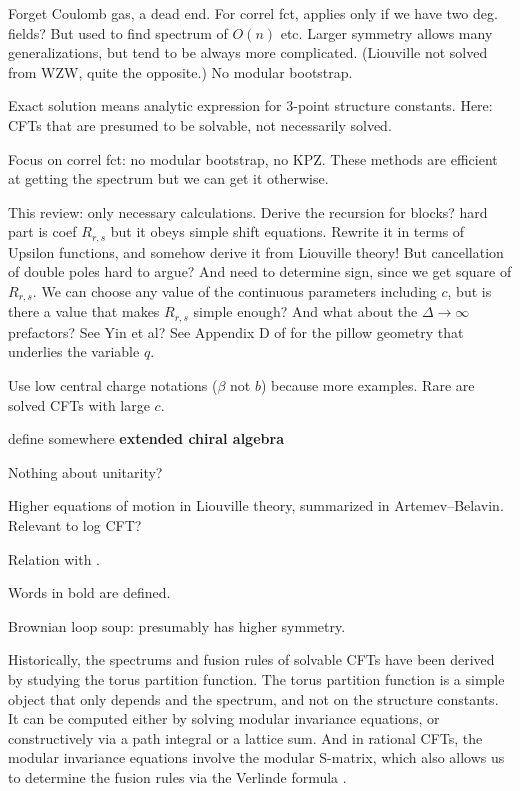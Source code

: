 \documentclass[12pt, a4paper]{article}
\theoremstyle{break}
\begin{document}
Forget Coulomb gas, a dead end. For correl fct, applies only if we have two deg. fields? But used to find spectrum of $O(n)$ etc. Larger symmetry allows many generalizations, but tend to be always more complicated. (Liouville not solved from WZW, quite the opposite.) No modular bootstrap. 

Exact solution means analytic expression for 3-point structure constants. Here: CFTs that are presumed to be solvable, not necessarily solved. 

Focus on correl fct: no modular bootstrap, no KPZ. These methods are efficient at getting the spectrum but we can get it otherwise. 

This review: only necessary calculations. Derive the recursion for blocks? hard part is coef $R_{r,s}$ but it obeys simple shift equations. Rewrite it in terms of Upsilon functions, and somehow derive it from Liouville theory! But cancellation of double poles hard to argue? And need to determine sign, since we get square of $R_{r,s}$. We can choose any value of the continuous parameters including $c$, but is there a value that makes $R_{r,s}$ simple enough? And what about the $\Delta\to\infty$ prefactors? See Yin et al? See Appendix D of \cite{msz15} for the pillow geometry that underlies the variable $q$.

Use low central charge notations ($\beta$ not $b$) because more examples. Rare are solved CFTs with large $c$.

define somewhere \textbf{extended chiral algebra}

Nothing about unitarity?

Higher equations of motion in Liouville theory, summarized in Artemev--Belavin. Relevant to log CFT? 

Relation with \cite{rib16}.

Words in bold are defined.


Brownian loop soup: presumably has higher symmetry.

Historically, the spectrums and fusion rules of solvable CFTs have been derived by studying the torus partition function. The torus partition function is a simple object that only depends and the spectrum, and not on the structure constants. It can be computed either by solving modular invariance equations, or constructively via a path integral or a lattice sum. And in rational CFTs, the modular invariance equations involve the modular S-matrix, which also allows us to determine the fusion rules via the Verlinde formula \cite{fms97}.
\end{document}
